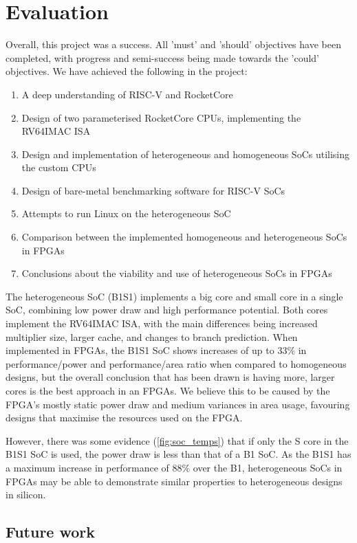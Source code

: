 \chapter{Evaluation}
\label{ch:evaluation}
Overall, this project was a success. All 'must' and 'should' objectives have been completed, with progress and semi-success being made towards the 'could' objectives. We have achieved the following in the project:

\begin{enumerate}
    \item A deep understanding of RISC-V and RocketCore
    \item Design of two parameterised RocketCore CPUs, implementing the RV64IMAC ISA
    \item Design and implementation of heterogeneous and homogeneous SoCs utilising the custom CPUs
    \item Design of bare-metal benchmarking software for RISC-V SoCs
    \item Attempts to run Linux on the heterogeneous SoC
    \item Comparison between the implemented homogeneous and heterogeneous SoCs in FPGAs
    \item Conclusions about the viability and use of heterogeneous SoCs in FPGAs
\end{enumerate}

The heterogeneous SoC (B1S1) implements a big core and small core in a single SoC, combining low power draw and high performance potential. Both cores implement the RV64IMAC ISA, with the main differences being increased multiplier size, larger cache, and changes to branch prediction. When implemented in FPGAs, the B1S1 SoC shows increases of up to 33\% in performance/power and performance/area ratio when compared to homogeneous designs, but the overall conclusion that has been drawn is having more, larger cores is the best approach in an FPGAs. We believe this to be caused by the FPGA's mostly static power draw and medium variances in area usage, favouring designs that maximise the resources used on the FPGA.

However, there was some evidence (\ref{fig:soc_temps}) that if only the S core in the B1S1 SoC is used, the power draw is less than that of a B1 SoC. As the B1S1 has a maximum increase in performance of 88\% over the B1, heterogeneous SoCs in FPGAs may be able to demonstrate similar properties to heterogeneous designs in silicon.

\section{Future work}
